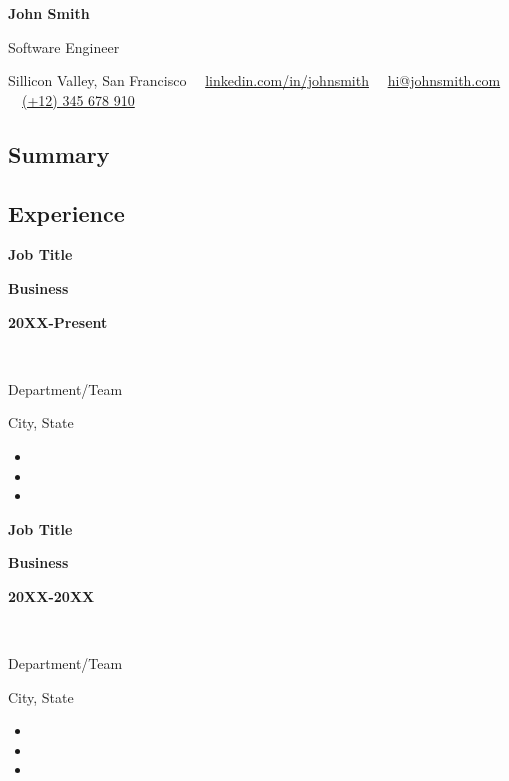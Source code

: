 \documentclass[10pt,a4paper]{article}
\newcommand\splitlinehalf[3][t]{%
  \parbox[#1]{\splitcolone\textwidth}{\raggedright#2}%
  \parbox[#1]{\splitcoltwo\textwidth}{\centering#3}%
}
\newcommand\splitlinethirds[4][t]{%
  \parbox[#1]{\splitcolone\textwidth}{\raggedright#2}%
  \parbox[#1]{\splitcoltwo\textwidth}{\centering#3}%
  \parbox[#1]{\splitcolthree\textwidth}{\raggedleft#4}%
}
\def \splitcolone {0.35}
\def \splitcoltwo {0.35}
\def \splitcolthree {0.3}
\begin{document}

\begin{center}
	{\LARGE \textbf{John Smith}}\vspace{0.2cm}
			
	{\large Software Engineer}\vspace{0.2cm}
			
	\faHome Sillicon Valley, San Francisco \ \
	\faLinkedin\href{https://linkedin.com/in/johnsmith}{linkedin.com/in/johnsmith} \ \
	\faEnvelope\href{mailto:hi@johnsmith.com}{hi@johnsmith.com} \ \
	\faMobile\href{tel:+12345678910}{(+12) 345 678 910} \ \
\end{center}



\subsection*{\textcolor{accent}{\Large Summary  \sout{\hfill}}} 

\lipsum[1][1-9]



\subsection*{\textcolor{accent}{\Large Experience  \sout{\hfill}}} 

\splitlinethirds{\textbf{Job Title}}{\textbf{Business}}{\textbf{20XX-Present}}\\
\splitlinehalf{Department/Team}{City, State}
\begin{itemize}
	\item \lipsum[1][1-2]
	\item \lipsum[1][2-3]
	\item \lipsum[1][4-6]
\end{itemize}

\splitlinethirds{\textbf{Job Title}}{\textbf{Business}}{\textbf{20XX-20XX}}\\
\splitlinehalf{Department/Team}{City, State}
\begin{itemize}
	\item \lipsum[2][1-2]
	\item \lipsum[2][2-3]
	\item \lipsum[2][4-6]
\end{itemize}
\end{document}
